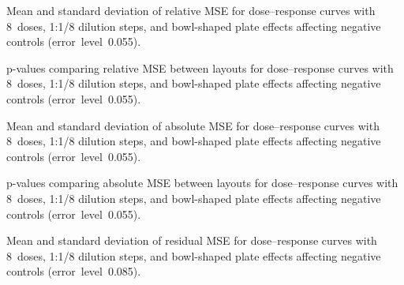 \begin{table}[p]
    \centering
    \small
    
    \caption{Mean and standard deviation of relative \ECIC{} MSE for dose--response curves with 8~doses, 1:1/8 dilution steps, and bowl-shaped plate effects affecting negative controls (error~level~0.055).}
    \label{tab:dr-relic50-mean-std-8doses-dil8-bowl-neg-controls-0.055}
\end{table}

\begin{table}[p]
    \centering
    \small
    
    \caption{p-values comparing relative \ECIC{} MSE between layouts for dose--response curves with 8~doses, 1:1/8 dilution steps, and bowl-shaped plate effects affecting negative controls (error~level~0.055).}
    \label{tab:dr-relic50-pvalues-8doses-dil8-bowl-neg-controls-0.055}
\end{table}

\begin{table}[p]
    \centering
    \small
    
    \caption{Mean and standard deviation of absolute \ECIC{} MSE for dose--response curves with 8~doses, 1:1/8 dilution steps, and bowl-shaped plate effects affecting negative controls (error~level~0.055).}
    \label{tab:dr-absic50-mean-std-8doses-dil8-bowl-neg-controls-0.055}
\end{table}

\begin{table}[p]
    \centering
    \small
    
    \caption{p-values comparing absolute \ECIC{} MSE between layouts for dose--response curves with 8~doses, 1:1/8 dilution steps, and bowl-shaped plate effects affecting negative controls (error~level~0.055).}
    \label{tab:dr-absic50-pvalues-8doses-dil8-bowl-neg-controls-0.055}
\end{table}

\begin{table}[p]
    \centering
    \small
    
    \caption{Mean and standard deviation of residual MSE for dose--response curves with 8~doses, 1:1/8 dilution steps, and bowl-shaped plate effects affecting negative controls (error~level~0.085).}
    \label{tab:dr-residuals-mean-std-8doses-dil8-bowl-neg-controls-0.085}
\end{table}


